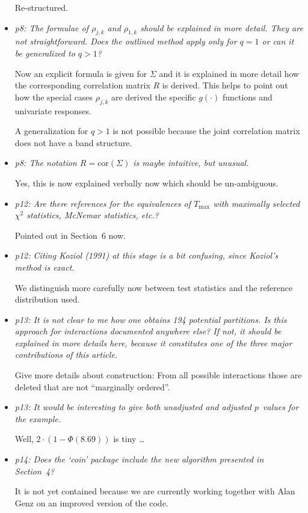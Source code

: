 \documentclass[11pt,a4paper]{article}
\begin{document}
\begin{itemize}
	Re-structured.
	
  \item \textit{p8: The formulae of $\rho_{j,k}$ and $\rho_{1,k}$ should be
        explained in more detail. They are not straightforward. Does the outlined
	method apply only for $q = 1$ or can it be generalized to $q > 1$?}
	
	Now an explicit formula is given for $\Sigma$ and it is explained in more
	detail how the corresponding correlation matrix $R$ is derived. This
	helps to point out how the special cases $\rho_{j, k}$ are
	derived the specific $g(\cdot)$ functions and univariate responses.
	
	A generalization for $q > 1$ is not possible because the joint correlation
	matrix does not have a band structure.
	
  \item \textit{p8: The notation $R = \mbox{cor}(\Sigma)$ is maybe intuitive, but unusual.}
  
        Yes, this is now explained verbally now which should be un-ambiguous.
	
  \item \textit{p12: Are there references for the equivalences of $T_{\max}$ with maximally
        selected $\chi^2$ statistics, McNemar statistics, etc.?}
	
	Pointed out in Section~6 now.
	
  \item \textit{p12: Citing Koziol (1991) at this stage is a bit confusing, since
        Koziol's method is exact.}
	
	We distinguish more carefully now between test statistics and the reference
	distribution used.
	
  \item \textit{p13: It is not clear to me how one obtains 194 potential partitions.
        Is this approach for interactions documented anywhere else? If not, it should be
        explained in more details here, because it constitutes one of the three major
        contributions of this article.}
	
	Give more details about construction: From all possible interactions those are
	deleted that are not ``marginally ordered''.
	
  \item \textit{p13: It would be interesting to give both unadjusted and adjusted $p$~values
        for the example.}
	
	Well, $2 \cdot (1 - \Phi(8.69))$ is tiny \dots
	
  \item \textit{p14: Does the `coin' package include the new algorithm presented in
        Section~4?}
	
	It is not yet contained because we are currently working together with Alan Genz
	on an improved version of the code.
    
\end{itemize}
\end{document}
